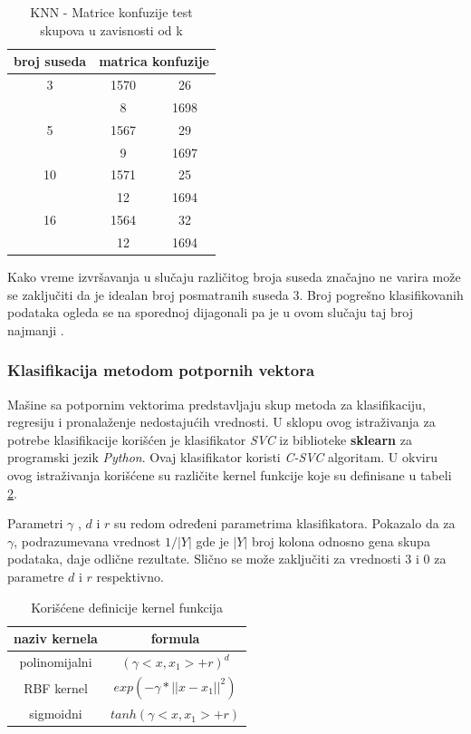 \documentclass[a4paper]{article}
\begin{document}
\begin{table}[h!]
\centering
\begin{tabular}{|c c c|} 
  \hline
  broj suseda & \multicolumn{2}{c|}{matrica konfuzije} \\ [0.5ex] 
  \hline
  3 & 1570 & 26 \\
     & 8 & 1698  \\
  \hline
  5 & 1567 & 29 \\
     & 9 & 1697  \\
  \hline
  10 & 1571 & 25 \\
     & 12 & 1694  \\
  \hline
  16 & 1564 & 32 \\
     & 12 & 1694  \\
 [1ex] 
 \hline
\end{tabular}
\caption{KNN - Matrice konfuzije test skupova u zavisnosti od k}
\label{table:knnconfusion}
\end{table}

Kako vreme izvršavanja u slučaju različitog broja suseda značajno ne varira može se zaključiti da je idealan broj posmatranih suseda 3. Broj pogrešno klasifikovanih podataka ogleda se na sporednoj dijagonali pa je u ovom slučaju taj broj najmanji \cite{classification}.

\subsubsection{Klasifikacija metodom
potpornih vektora}
\label{potVektor}

Mašine sa potpornim vektorima predstavljaju skup metoda za klasifikaciju, regresiju i pronalaženje nedostajućih vrednosti. U sklopu ovog istraživanja za potrebe klasifikacije korišćen je klasifikator \textit{SVC} iz biblioteke \textbf{sklearn} za programski jezik \textit{Python}. Ovaj klasifikator koristi  \textit{C-SVC} algoritam. U okviru ovog istraživanja korišćene su različite kernel funkcije koje su definisane u tabeli \ref{table:kerneli}. 

Parametri $\gamma$ , $d$ i $r$ su redom određeni parametrima klasifikatora. Pokazalo da za $\gamma$, podrazumevana vrednost $1/|Y|$ gde je $|Y|$ broj kolona odnosno gena skupa podataka, daje odlične rezultate. Slično se može zaključiti za vrednosti 3 i 0 za parametre $d$ i $r$ respektivno.



\begin{table}[h!]
\centering
\begin{tabular}{|c c|} 
 \hline
  naziv kernela & formula\\ [0.5ex] 
 \hline
 polinomijalni & $(\gamma <x, x_1> + r )^{d}$\\ 
 RBF kernel & $exp(- \gamma * ||x - x_1||^{2})$\\
 sigmoidni & $tanh(\gamma <x, x_1> + r )$\\
 \hline
\end{tabular}
\caption{Korišćene definicije kernel funkcija}
\label{table:kerneli}
\end{table}
\end{document}
